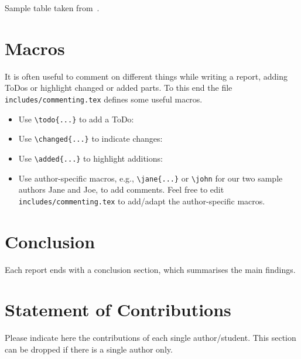 \documentclass[review]{AIM_report}
\begin{document}
\begin{table}
  \centering
    \renewcommand{\tabcolsep}{4pt}
    \renewcommand{\arraystretch}{1.1}
    
    \caption{Sample table taken from~\cite{BossekKN00T19TSPcreative}.}
    \label{fig:sample_table}
\end{table}

\section{Macros}

It is often useful to comment on different things while writing a report, adding ToDos or highlight changed or added parts. To this end the file \texttt{includes/commenting.tex} defines some useful macros.
\begin{itemize}
    \item Use \verb|\todo{...}| to add a ToDo:\newline {}
    \item Use \verb|\changed{...}| to indicate changes:\newline {}
    \item Use \verb|\added{...}| to highlight additions:\newline {}
    \item Use author-specific macros, e.g., \verb|\jane{...}| or \verb|\john| for our two sample authors Jane and Joe, to add comments. Feel free to edit \texttt{includes/commenting.tex} to add/adapt the author-specific macros.\newline{}
    \newline
\end{itemize}

\section{Conclusion}

Each report ends with a conclusion section, which summarises the main findings. 

\section*{Statement of Contributions}

Please indicate here the contributions of each single author/student. This section can be dropped if there is a single author only.

\printbibliography

\newpage
\pagestyle{empty}


\end{document}
